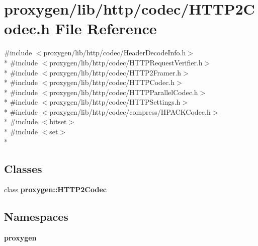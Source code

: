 \section{proxygen/lib/http/codec/\+H\+T\+T\+P2\+Codec.h File Reference}
\label{HTTP2Codec_8h}
{\ttfamily \#include $<$proxygen/lib/http/codec/\+Header\+Decode\+Info.\+h$>$}\\*
{\ttfamily \#include $<$proxygen/lib/http/codec/\+H\+T\+T\+P\+Request\+Verifier.\+h$>$}\\*
{\ttfamily \#include $<$proxygen/lib/http/codec/\+H\+T\+T\+P2\+Framer.\+h$>$}\\*
{\ttfamily \#include $<$proxygen/lib/http/codec/\+H\+T\+T\+P\+Codec.\+h$>$}\\*
{\ttfamily \#include $<$proxygen/lib/http/codec/\+H\+T\+T\+P\+Parallel\+Codec.\+h$>$}\\*
{\ttfamily \#include $<$proxygen/lib/http/codec/\+H\+T\+T\+P\+Settings.\+h$>$}\\*
{\ttfamily \#include $<$proxygen/lib/http/codec/compress/\+H\+P\+A\+C\+K\+Codec.\+h$>$}\\*
{\ttfamily \#include $<$bitset$>$}\\*
{\ttfamily \#include $<$set$>$}\\*
\subsection*{Classes}
\begin{DoxyCompactItemize}
\item 
class {\bf proxygen\+::\+H\+T\+T\+P2\+Codec}
\end{DoxyCompactItemize}
\subsection*{Namespaces}
\begin{DoxyCompactItemize}
\item 
 {\bf proxygen}
\end{DoxyCompactItemize}
